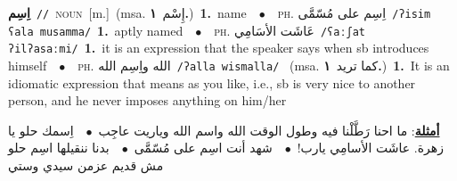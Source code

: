 \documentclass[10pt,a4paper,twoside]{article} %
\begin{document}
\begin{multicols}{2}
{\setlength\topsep{0pt}\textbf{\foreignlanguage{arabic}{اِسِم}}\ {\color{gray}\texttt{//}\color{black}}\ \textsc{noun}\ [m.]\ \color{gray}(msa. \foreignlanguage{arabic}{إِسْم}~\foreignlanguage{arabic}{\textbf{١.}})\color{black}\ \textbf{1.}~name\ \ $\bullet$\ \ \textsc{ph.} \color{gray} \foreignlanguage{arabic}{اِسِم على مُسّمَّى}\color{black}\ {\color{gray}\texttt{/{\sffamily ʔisim ʕala musamma}/}\color{black}}\ \textbf{1.}~aptly named\ \ $\bullet$\ \ \textsc{ph.} \color{gray} \foreignlanguage{arabic}{عَاشَت الأسَامِي}\color{black}\ {\color{gray}\texttt{/{\sffamily ʕaːʃat ʔilʔasaːmi}/}\color{black}}\ \textbf{1.}~it is an expression that the speaker says when sb introduces himself\ \ $\bullet$\ \ \textsc{ph.} \color{gray} \foreignlanguage{arabic}{الله واِسِم الله}\color{black}\ {\color{gray}\texttt{/{\sffamily ʔalla wismalla}/}\color{black}}\ \color{gray} (msa. \foreignlanguage{arabic}{كما تريد}~\foreignlanguage{arabic}{\textbf{١.}})\color{black}\ \textbf{1.}~It is an idiomatic expression that means as you like, i.e., sb is very nice to another person, and he never imposes anything on him/her\  \begin{flushright}\color{gray}\foreignlanguage{arabic}{\textbf{\underline{\foreignlanguage{arabic}{أمثلة}}}: ما احنا رَطَّلْنا فيه وطول الوقت الله واسم الله وياريت عاجِب\ $\bullet$\ \  اِسمك حلو يا زهرة. عاشَت الأسامِي يارب!\ $\bullet$\ \  شهد أنت اسِم على مُسّمَّى\ $\bullet$\ \  بدنا ننقيلها اسِم حلو مش قديم عزمن سيدي وستي}\end{flushright}\color{black}} \vspace{2mm}


\end{multicols}
\end{document}
